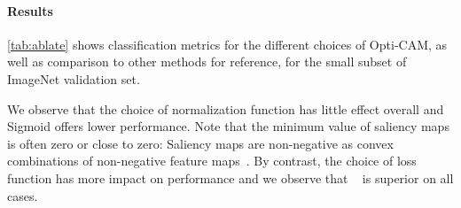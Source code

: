 
\paragraph{Results}

\autoref{tab:ablate} shows classification metrics for the different choices of Opti-CAM, as well as 
comparison to other methods for reference, for the small subset of ImageNet validation set.

We observe that the choice of normalization function has little effect overall and Sigmoid offers 
lower performance. Note that the minimum value of saliency maps is often zero or close to zero: 
Saliency maps are non-negative as convex combinations of non-negative feature maps~. By 
contrast, the choice of loss function has more impact on performance and we observe that \Fdef
~ is superior on all cases.



